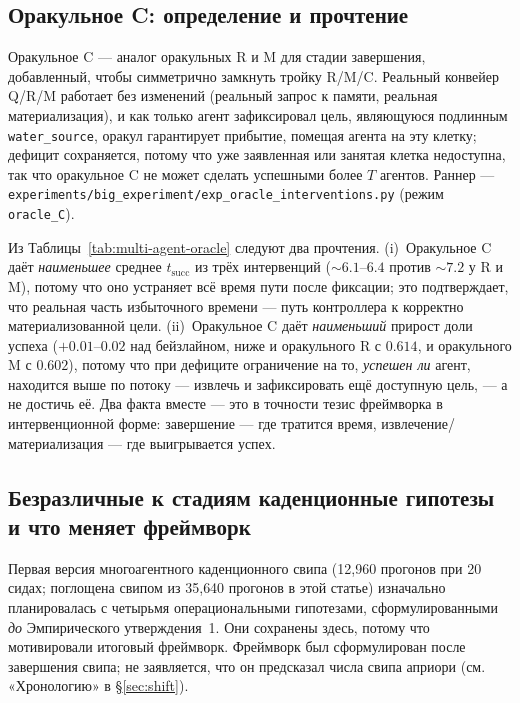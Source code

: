 \documentclass{article}
\newcommand{\method}[1]{\texttt{#1}}
\begin{document}
\subsection{Оракульное C: определение и прочтение}
\label{app:oracle-c-def}

Оракульное C --- аналог оракульных R и M для стадии завершения, добавленный, чтобы симметрично замкнуть тройку R/M/C. Реальный конвейер Q/R/M работает без изменений (реальный запрос к памяти, реальная материализация), и как только агент зафиксировал цель, являющуюся подлинным \texttt{water\_source}, оракул гарантирует прибытие, помещая агента на эту клетку; дефицит сохраняется, потому что уже заявленная или занятая клетка недоступна, так что оракульное C не может сделать успешными более $T$ агентов. Раннер --- \method{experiments/big\_experiment/exp\_oracle\_interventions.py} (режим \method{oracle\_C}).

Из Таблицы~\ref{tab:multi-agent-oracle} следуют два прочтения. (i)~Оракульное C даёт \emph{наименьшее} среднее $t_{\mathrm{succ}}$ из трёх интервенций ($\sim6.1$--$6.4$ против $\sim7.2$ у R и M), потому что оно устраняет всё время пути после фиксации; это подтверждает, что реальная часть избыточного времени --- путь контроллера к корректно материализованной цели. (ii)~Оракульное C даёт \emph{наименьший} прирост доли успеха ($+0.01$--$0.02$ над бейзлайном, ниже и оракульного R с $0.614$, и оракульного M с $0.602$), потому что при дефиците ограничение на то, \emph{успешен ли} агент, находится выше по потоку --- извлечь и зафиксировать ещё доступную цель, --- а не достичь её. Два факта вместе --- это в точности тезис фреймворка в интервенционной форме: завершение --- где тратится время, извлечение/материализация --- где выигрывается успех.

\subsection{Безразличные к стадиям каденционные гипотезы и что меняет фреймворк}
\label{app:standalone-hypotheses}

Первая версия многоагентного каденционного свипа (12{,}960 прогонов при 20 сидах; поглощена свипом из 35{,}640 прогонов в этой статье) изначально планировалась с четырьмя операциональными гипотезами, сформулированными \emph{до} Эмпирического утверждения~1. Они сохранены здесь, потому что мотивировали итоговый фреймворк. Фреймворк был сформулирован после завершения свипа; не заявляется, что он предсказал числа свипа априори (см. «Хронологию» в \S\ref{sec:shift}).
\end{document}
